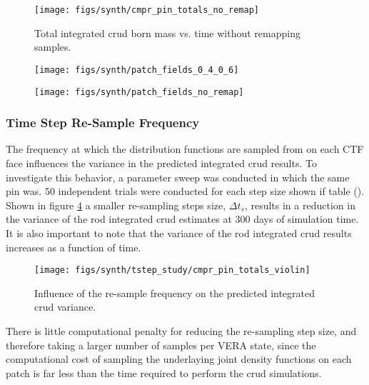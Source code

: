 \begin{figure}[H]
    \centering
    \texttt{[image: figs/synth/cmpr\_pin\_totals\_no\_remap]}
    \caption{Total integrated crud born mass vs. time without remapping samples.}
    \label{fig:cmprpintotalsnoremap}
\end{figure}

\begin{figure}[H]
    \centering
    \texttt{[image: figs/synth/patch\_fields\_0\_4\_0\_6]}
    \caption{}
    \label{fig:patchfields0406}
\end{figure}
\begin{figure}[H]
    \centering
    \texttt{[image: figs/synth/patch\_fields\_no\_remap]}
    \caption{}
    \label{fig:patchfieldsnoremap}
\end{figure}

\subsubsection{Time Step Re-Sample Frequency}

The frequency at which the distribution functions are sampled from on each CTF face influences the variance in the predicted integrated crud results.  To investigate this behavior, a parameter sweep was conducted in which the same pin was.  50 independent trials were conducted for each step size shown if table ().  Shown in figure \ref{fig:cmprpintotalsviolin} a smaller re-sampling steps size, $\Delta t_s$, results in a reduction in the variance of the rod integrated crud estimates at 300 days of simulation time.  It is also important to note that the variance of the rod integrated crud results increases as a function of time.

\begin{figure}[H]
    \centering
    \texttt{[image: figs/synth/tstep\_study/cmpr\_pin\_totals\_violin]}
    \caption{Influence of the re-sample frequency on the predicted integrated crud variance.}
    \label{fig:cmprpintotalsviolin}
\end{figure}

There is little computational penalty for reducing the re-sampling step size, and therefore taking a larger number of samples per VERA state, since the computational cost of sampling the underlaying joint density functions on each patch is far less than the time required to perform the crud simulations.


